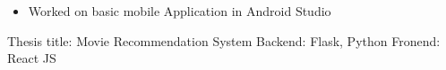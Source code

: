 \documentclass[10pt,a4paper,ragged2e,withhyper]{altacv}
\let\olditem\item
\renewcommand{\item}{\small\olditem}
\begin{document}
\begin{paracol}{2}
\begin{itemize}
\item Worked on basic mobile Application in Android Studio
\end{itemize}
\vspace{2mm}


\begin{outline}
\1 Thesis title: Movie Recommendation System
\2 Backend: Flask, Python
\2 Fronend: React JS
\end{outline} 
\vspace{3mm}






\end{paracol}
\end{document}

